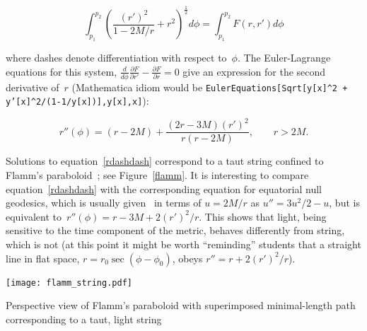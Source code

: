 \documentclass{ws-tpe}
\begin{document}

\begin{equation}
  \int_{p_1}^{p_2}\left(\frac{\left(r'\right)^2}{1-2M/r} + r^2\right)^\frac{1}{2}d\phi=
  \int_{p_1}^{p_2}F\left(r,r'\right)d\phi
\end{equation}

\noindent where dashes denote differentiation with respect to~$\phi$.
The Euler-Lagrange equations for this system,
$\frac{d}{d\phi}\frac{\partial F}{\partial r'}-\frac{\partial
  F}{\partial r}=0$ give an expression for the second derivative
of~$r$ (Mathematica idiom would be {\tt EulerEquations[Sqrt[y[x]\^{}2
      + y'[x]\^{}2/(1-1/y[x])],y[x],x]}):

\begin{equation}\label{rdashdash}
  r''\left(\phi\right) =
  (r-2M) + \frac{(2r-3M)\left(r'\right)^2}{r\left(r-2M\right)},\qquad r>2M.
\end{equation}

\noindent Solutions to equation~\ref{rdashdash} correspond to a taut
string confined to Flamm's paraboloid~\cite{flamm1916}; see
Figure~\ref{flamm}.  It is interesting to compare
equation~\ref{rdashdash} with the corresponding equation for
equatorial null geodesics, which is usually given~\cite{wald} in terms
of $u=2M/r$ as $u''=3u^2/2-u$, but is equivalent
to~$r''\left(\phi\right)=r-3M+2\left(r'\right)^2/r$.  This shows that
light, being sensitive to the time component of the metric, behaves
differently from string, which is not (at this point it might be worth
``reminding'' students that a straight line in flat space,
$r=r_0\sec\left(\phi-\phi_0\right)$, obeys
$r''=r+2\left(r'\right)^2/r$).

\begin{figurehere} %
\centering
\texttt{[image: flamm\_string.pdf]}
\caption{Perspective view of Flamm's paraboloid with superimposed minimal-length
  path corresponding to a taut, light string}
\label{flamm}
\end{figurehere}
\end{document}
